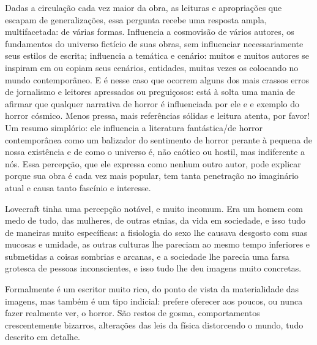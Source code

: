 \begin{changemargin}
\bigskip


Dadas a circulação cada vez maior da obra, as leituras e apropriações que escapam de generalizações, essa pergunta recebe uma resposta ampla, multifacetada: de várias formas. Influencia a cosmovisão de vários autores, os fundamentos do universo fictício de suas obras, sem influenciar necessariamente seus estilos de escrita; influencia a temática e cenário: muitos e muitos autores se inspiram em ou copiam seus cenários, entidades, muitas vezes os colocando no mundo contemporâneo. E é nesse caso que ocorrem alguns dos mais crassos erros de jornalismo e leitores apressados ou preguiçosos: está à solta uma mania de afirmar que qualquer narrativa de horror é influenciada por ele e e exemplo do horror cósmico. Menos pressa, mais referências sólidas e leitura atenta, por favor! Um resumo simplório: ele influencia a literatura fantástica/de horror contemporânea como um balizador do sentimento de horror perante à pequena de nossa existência e de como o universo é, não caótico ou hostil, mas indiferente a nós. Essa percepção, que ele expressa como nenhum outro autor, pode explicar porque sua obra é cada vez mais popular, tem tanta penetração no imaginário atual e causa tanto fascínio e interesse.

\bigskip
\bigskip


\bigskip


Lovecraft tinha uma percepção notável, e muito incomum. Era um homem com medo de tudo, das mulheres, de outras etnias, da vida em sociedade, e isso tudo de maneiras muito específicas: a fisiologia do sexo lhe causava desgosto com suas mucosas e umidade, as outras culturas lhe pareciam ao mesmo tempo inferiores e submetidas a coisas sombrias e arcanas, e a sociedade lhe parecia uma farsa grotesca de pessoas inconscientes, e isso tudo lhe deu imagens muito concretas.

Formalmente é um escritor muito rico, do ponto de vista da materialidade das imagens, mas também é um tipo indicial: prefere oferecer aos poucos, ou nunca fazer realmente ver, o horror. São restos de gosma, comportamentos crescentemente bizarros, alterações das leis da física distorcendo o mundo, tudo descrito em detalhe.


\end{changemargin}
